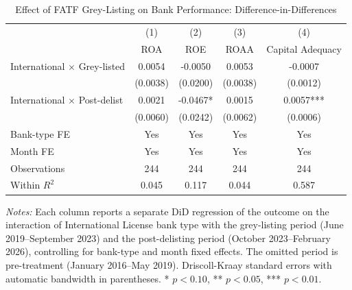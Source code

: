 \begin{table}[H]
\centering
\caption{Effect of FATF Grey-Listing on Bank Performance: Difference-in-Differences}
\label{tab:main}
\begin{threeparttable}
\begin{tabular}{lcccc}
\toprule
 & (1) & (2) & (3) & (4) \\
 & ROA & ROE & ROAA & Capital Adequacy \\
\midrule
International $\times$ Grey-listed & 0.0054 & -0.0050 & 0.0053 & -0.0007 \\
 & (0.0038) & (0.0200) & (0.0038) & (0.0012) \\[6pt]
International $\times$ Post-delist & 0.0021 & -0.0467* & 0.0015 & 0.0057*** \\
 & (0.0060) & (0.0242) & (0.0062) & (0.0006) \\
\midrule
Bank-type FE & Yes & Yes & Yes & Yes \\
Month FE & Yes & Yes & Yes & Yes \\
Observations & 244 & 244 & 244 & 244 \\
Within $R^2$ & 0.045 & 0.117 & 0.044 & 0.587 \\
\bottomrule
\end{tabular}
\begin{tablenotes}[flushleft]
\small
\item \textit{Notes:} Each column reports a separate DiD regression of the outcome on the interaction of International License bank type with the grey-listing period (June 2019--September 2023) and the post-delisting period (October 2023--February 2026), controlling for bank-type and month fixed effects. The omitted period is pre-treatment (January 2016--May 2019). Driscoll-Kraay standard errors with automatic bandwidth in parentheses. * $p<0.10$, ** $p<0.05$, *** $p<0.01$.
\end{tablenotes}
\end{threeparttable}
\end{table}
